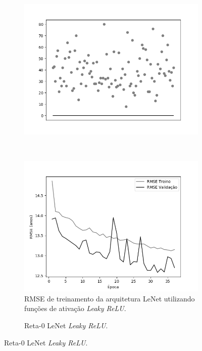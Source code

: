 \begin{figure}[hb!]
\begin{subfigure}[hb]{0.5\linewidth}
			\includegraphics[width=\linewidth]{img/graficos/reta0/lenet/fig-reta-0-image-treat-3-lenet-relu.png}%
		\end{subfigure}\\
		\begin{subfigure}[hb]{0.5\linewidth}
			\caption{RMSE de treinamento da arquitetura LeNet utilizando funções de ativação \emph{Leaky ReLU}.}
			\includegraphics[width=\linewidth]{img/graficos/history/lenet/fig-history-image-treat-3-lenet-lrelu-rmse.png}
		\end{subfigure}
		\begin{subfigure}[hb]{0.5\linewidth}
			\caption{Reta-0 LeNet \emph{Leaky ReLU}.}

\end{subfigure}
\end{figure}
